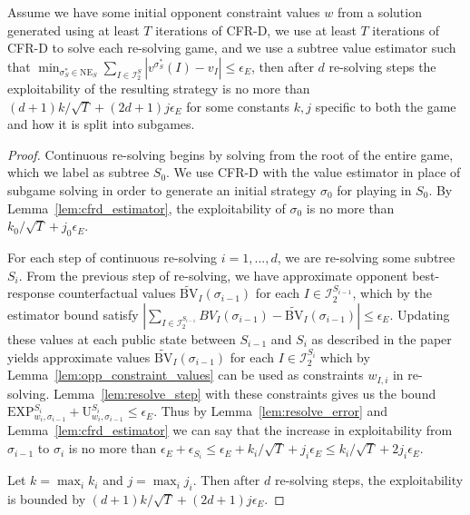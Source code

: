 \begin{theorem}
  Assume we have some initial opponent constraint values $w$ from a
  solution generated using at least $T$ iterations of CFR-D, we use at
  least $T$ iterations of CFR-D to solve each re-solving game, and we
  use a subtree value estimator such that $\min_{\sigma_S^* \in
    \text{NE}_S} \sum_{I \in \mathcal{I}^S_2} |v^{\sigma_S^*} (I)-v_I|
  \le \epsilon_E$, then after $d$ re-solving steps the exploitability
  of the resulting strategy is no more than $(d+1)k/\sqrt{T} +
  (2d+1)j\epsilon_E$ for some constants $k,j$ specific to both the
  game and how it is split into subgames.
  \label{thm:deepstack}
\end{theorem}
\begin{proof}
  Continuous re-solving begins by solving from the root of the entire game, which we label as
  subtree $S_0$. We use CFR-D with the value estimator in place of subgame solving 
  in order to generate an initial strategy $\sigma_0$ for playing in $S_0$. 
  By Lemma~\ref{lem:cfrd_estimator}, the exploitability
  of $\sigma_0$ is no more than $k_0/\sqrt{T} + j_0\epsilon_E$.
  
  For each step of continuous re-solving $i = 1,...,d$, we are re-solving some
  subtree $S_i$. From the previous step of re-solving, we have approximate opponent 
  best-response counterfactual values $\widetilde{\mathrm{BV}}_I(\sigma_{i-1})$ for each
  $I \in \mathcal{I}^{S_{i-1}}_2$, which by the estimator bound satisfy 
  $|\sum_{I \in \mathcal{I}^{S_{i-1}}_2} BV_I(\sigma_{i-1}) - \widetilde{\mathrm{BV}}_I(\sigma_{i-1})| \leq \epsilon_E$.
  Updating these values at each public state between $S_{i-1}$ and $S_{i}$ 
  as described in the paper yields approximate values $\widetilde{\mathrm{BV}}_I(\sigma_{i-1})$ 
  for each $I \in \mathcal{I}^{S_i}_2$ which by Lemma~\ref{lem:opp_constraint_values}
  can be used as constraints $w_{I,i}$ in re-solving. Lemma~\ref{lem:resolve_step} with these constraints
  gives us the bound $\text{EXP}^{S_i}_{w_i,\sigma_{i-1}} +
  \text{U}^{S_i}_{w_i,\sigma_{i-1}} \le \epsilon_E$.
  Thus by Lemma~\ref{lem:resolve_error} and Lemma~\ref{lem:cfrd_estimator} we
  can say that the increase in exploitability from $\sigma_{i-1}$ to
  $\sigma_i$ is no more than $\epsilon_E + \epsilon_{S_i} \leq \epsilon_E + k_i/\sqrt{T} + j_i\epsilon_E
  \leq  k_i/\sqrt{T} + 2j_i\epsilon_E$.

  Let $k = \max_i k_i$ and $j = \max_i j_i$. Then after $d$ re-solving
  steps, the exploitability is bounded by $(d+1)k/\sqrt{T} +
  (2d+1)j\epsilon_E$.
\end{proof}

